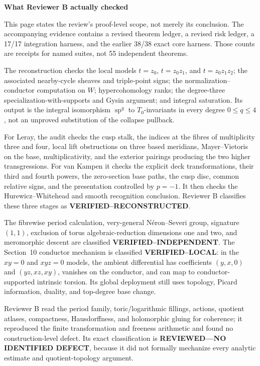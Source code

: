 {\fontsize{15.2pt}{16.6pt}\selectfont\bfseries What Reviewer B actually checked}
\par\vspace{2pt}
{\ResultSmall
This page states the review's proof-level scope, not merely its conclusion.
The accompanying evidence contains a revised theorem ledger, a revised risk
ledger, a 17/17 integration harness, and the earlier 38/38 exact core harness.
Those counts are receipts for named suites, not 55 independent theorems.
}

{\ResultSmall
The reconstruction checks the local models
\(t=z_0\), \(t=z_0z_1\), and \(t=z_0z_1z_2\); the associated nearby-cycle
sheaves and triple-point signs; the normalization--conductor computation on
\(W\); hypercohomology ranks; the degree-three specialization-with-supports
and Gysin argument; and integral saturation.  Its output is the integral
isomorphism $\operatorname{sp}^q$ to $T_0$-invariants in every degree
\(0\le q\le4\), not an unproved substitution of the collapse pullback.
}

{\ResultSmall
For Leray, the audit checks the cusp stalk, the indices at the fibres of
multiplicity three and four, local lift obstructions on three based
meridians, Mayer--Vietoris on the base, multiplicativity, and the exterior
pairings producing the two higher transgressions.  For van Kampen it checks
the explicit deck transformations, their third and fourth powers, the
zero-section base paths, the cusp disc, common relative signs, and the
presentation controlled by $p=-1$.  It then checks the Hurewicz--Whitehead
and smooth recognition conclusion.  Reviewer B classifies these three
stages as \textbf{VERIFIED--RECONSTRUCTED}.
}

{\ResultSmall
The fibrewise period calculation, very-general N\'eron--Severi group,
signature $(1,1)$, exclusion of torus algebraic-reduction dimensions one
and two, and meromorphic descent are classified
\textbf{VERIFIED--INDEPENDENT}.  The Section~10 conductor mechanism is
classified \textbf{VERIFIED--LOCAL}: in the $xy=0$ and $xyz=0$ models,
the ambient differential has coefficients $(y,x,0)$ and $(yz,xz,xy)$,
vanishes on the conductor, and can map to conductor-supported intrinsic
torsion.  Its global deployment still uses topology, Picard information,
duality, and top-degree base change.
}

{\ResultSmall
Reviewer B read the period family, toric/logarithmic fillings, actions,
quotient atlases, compactness, Hausdorffness, and holomorphic gluing for
coherence; it reproduced the finite transformation and freeness arithmetic
and found no construction-level defect.  Its exact classification is
\textbf{REVIEWED---NO IDENTIFIED DEFECT}, because it did not formally
mechanize every analytic estimate and quotient-topology argument.
}

